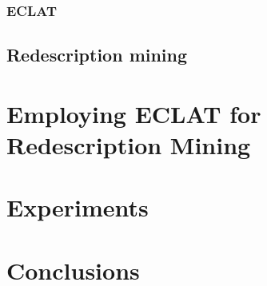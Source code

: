 \subsection{ECLAT}

\section{Redescription mining}


\chapter{Employing ECLAT for Redescription Mining}
\label{cha:employment}

\chapter{Experiments}
\label{cha:experiments}

\chapter{Conclusions}
\label{cha:conclusions}